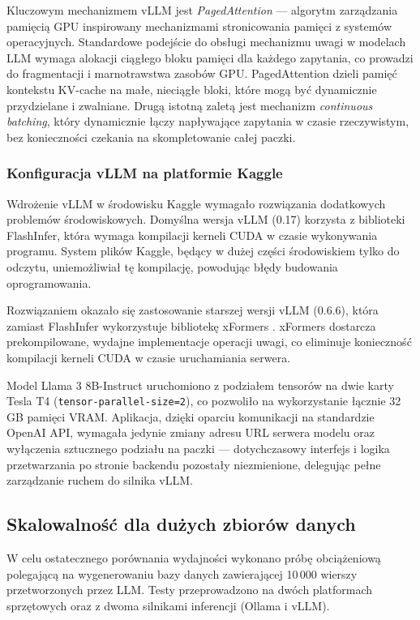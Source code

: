 Kluczowym mechanizmem vLLM jest \textit{PagedAttention} --- algorytm zarządzania pamięcią GPU inspirowany mechanizmami stronicowania pamięci z systemów operacyjnych. Standardowe podejście do obsługi mechanizmu uwagi \cite{attention_ml} w modelach LLM wymaga alokacji ciągłego bloku pamięci dla każdego zapytania, co prowadzi do fragmentacji i marnotrawstwa zasobów GPU. PagedAttention dzieli pamięć kontekstu KV-cache na małe, nieciągłe bloki, które mogą być dynamicznie przydzielane i zwalniane. Drugą istotną zaletą jest mechanizm \textit{continuous batching}, który dynamicznie łączy napływające zapytania w czasie rzeczywistym, bez konieczności czekania na skompletowanie całej paczki.

\subsubsection*{Konfiguracja vLLM na platformie Kaggle}
Wdrożenie vLLM w środowisku Kaggle wymagało rozwiązania dodatkowych problemów środowiskowych. Domyślna wersja vLLM (0.17) korzysta z biblioteki FlashInfer, która wymaga kompilacji kerneli CUDA w czasie wykonywania programu. System plików Kaggle, będący w dużej części środowiskiem tylko do odczytu, uniemożliwiał tę kompilację, powodując błędy budowania oprogramowania.

Rozwiązaniem okazało się zastosowanie starszej wersji vLLM (0.6.6), która zamiast FlashInfer wykorzystuje bibliotekę xFormers \cite{xformers}. xFormers dostarcza prekompilowane, wydajne implementacje operacji uwagi, co eliminuje konieczność kompilacji kerneli CUDA w czasie uruchamiania serwera.

Model Llama 3 8B-Instruct uruchomiono z podziałem tensorów na dwie karty Tesla T4 (\texttt{tensor-parallel-size=2}), co pozwoliło na wykorzystanie łącznie 32 GB pamięci VRAM. Aplikacja, dzięki oparciu komunikacji na standardzie OpenAI API, wymagała jedynie zmiany adresu URL serwera modelu oraz wyłączenia sztucznego podziału na paczki --- dotychczasowy interfejs i logika przetwarzania po stronie backendu pozostały niezmienione, delegując pełne zarządzanie ruchem do silnika vLLM.

\subsection*{Skalowalność dla dużych zbiorów danych}
W celu ostatecznego porównania wydajności wykonano próbę obciążeniową polegającą na wygenerowaniu bazy danych zawierającej 10\,000 wierszy przetworzonych przez \gls{LLM}. Testy przeprowadzono na dwóch platformach sprzętowych oraz z dwoma silnikami inferencji (Ollama i vLLM).

